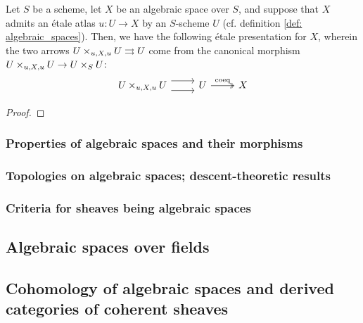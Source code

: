             \begin{proposition} \label{prop: existence_of_etale_presentations_of_algebraic_spaces}
                Let $S$ be a scheme, let $X$ be an algebraic space over $S$, and suppose that $X$ admits an \'etale atlas $u: U \to X$ by an $S$-scheme $U$ (cf. definition \ref{def: algebraic_spaces}). Then, we have the following \'etale presentation for $X$, wherein the two arrows $U \x_{u, X, u} U \toto U$ come from the canonical morphism $U \x_{u, X, u} U \to U \x_S U$:
                    $$
                        \begin{tikzcd}
                        	{U \x_{u, X, u} U} & U & X
                        	\arrow[shift right=2, from=1-1, to=1-2]
                        	\arrow[shift left=2, from=1-1, to=1-2]
                        	\arrow["\coeq", two heads, from=1-2, to=1-3]
                        \end{tikzcd}
                    $$ 
            \end{proposition}
                \begin{proof}
                    
                \end{proof}
                
            \begin{proposition} \label{prop: puhsouts_of_algebraic_spaces}
                
            \end{proposition}
    
        \subsubsection{Properties of algebraic spaces and their morphisms}
        
        \subsubsection{Topologies on algebraic spaces; descent-theoretic results}
        
        \subsubsection{Criteria for sheaves being algebraic spaces}
    
    \subsection{Algebraic spaces over fields}

    \subsection{Cohomology of algebraic spaces and derived categories of coherent sheaves}